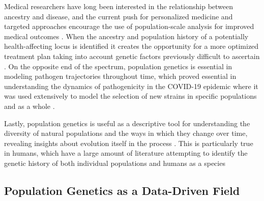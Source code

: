 Medical researchers have long been interested in the relationship between ancestry and disease, and the current push for personalized medicine and targeted approaches encourage the use of population-scale analysis for improved medical outcomes \cite{weischenfeldtPhenotypicImpactGenomic2013, ostrowCancerEvolutionAssociated2014}. When the ancestry and population history of a potentially health-affecting locus is identified it creates the opportunity for a more optimized treatment plan taking into account genetic factors previously difficult to ascertain \cite{schuleParkinsonDiseaseAssociated2017}. On the opposite end of the spectrum, population genetics is essential in modeling pathogen trajectories throughout time, which proved essential in understanding the dynamics of pathogenicity in the COVID-19 epidemic where it was used extensively to model the selection of new strains in specific populations and as a whole \cite{keplerDecomposingSourcesSARSCoV22021, wangPervasivePositiveSelection2021}.

Lastly, population genetics is useful as a descriptive tool for understanding the diversity of natural populations and the ways in which they change over time, revealing insights about evolution itself in the process \cite{duttaLossHeterozygositySpectrum2022, pelletierComplexitiesRecapitulatingPolygenic2022, diopBehavioralCostOverdominance2015}. This is particularly true in humans, which have a large amount of literature attempting to identify the genetic history of both individual populations and humans as a species \cite{voightMapRecentPositive2006, fengzhangCopyNumberVariation2009, sverrisdottirDirectEstimatesNatural2014, liInferenceHumanPopulation2011}

\subsection{Population Genetics as a Data-Driven Field}


